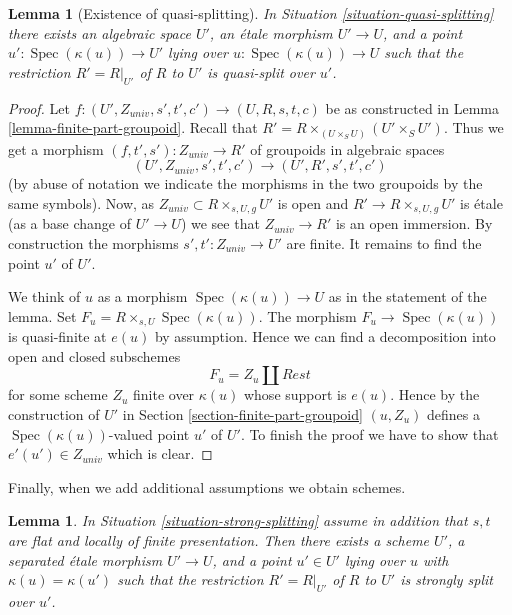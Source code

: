 \documentclass{stacks-project}
\theoremstyle{plain}
\newtheorem{lemma}[subsection]{Lemma}
\theoremstyle{definition}
\theoremstyle{remark}
\numberwithin{equation}{subsection}
\def\Spec{\mathop{\mathrm{Spec}}}
\begin{document}
\begin{lemma}[Existence of quasi-splitting]
\label{lemma-quasi-splitting}
In Situation \ref{situation-quasi-splitting}
there exists an algebraic space $U'$, an \'etale morphism
$U' \to U$, and a point $u' : \Spec(\kappa(u)) \to U'$
lying over $u : \Spec(\kappa(u)) \to U$
such that the restriction $R' = R|_{U'}$ of $R$ to $U'$
is quasi-split over $u'$.
\end{lemma}

\begin{proof}
Let $f : (U', Z_{univ}, s', t', c') \to (U, R, s, t, c)$ be as constructed in
Lemma \ref{lemma-finite-part-groupoid}.
Recall that $R' = R \times_{(U \times_S U)} (U' \times_S U')$.
Thus we get a morphism $(f, t', s') : Z_{univ} \to R'$ of groupoids
in algebraic spaces
$$
(U', Z_{univ}, s', t', c') \to (U', R', s', t', c')
$$
(by abuse of notation we indicate the morphisms in the two groupoids
by the same symbols). Now, as $Z_{univ} \subset R \times_{s, U, g} U'$ is open
and $R' \to R \times_{s, U, g} U'$ is \'etale (as a base change
of $U' \to U$) we see that $Z_{univ} \to R'$ is an open immersion.
By construction the morphisms $s', t' : Z_{univ} \to U'$ are finite.
It remains to find the point $u'$ of $U'$.

\medskip\noindent
We think of $u$ as a morphism $\Spec(\kappa(u)) \to U$ as in
the statement of the lemma. Set $F_u = R \times_{s, U} \Spec(\kappa(u))$.
The morphism $F_u \to \Spec(\kappa(u))$ is quasi-finite at $e(u)$
by assumption. Hence we can find a decomposition into open and closed
subschemes
$$
F_u = Z_u \amalg Rest
$$
for some scheme $Z_u$ finite over $\kappa(u)$ whose support is $e(u)$.
Hence by the construction of $U'$ in
Section \ref{section-finite-part-groupoid}
$(u, Z_u)$ defines a $\Spec(\kappa(u))$-valued
point $u'$ of $U'$. To finish the proof we have to show that
$e'(u') \in Z_{univ}$ which is clear.
\end{proof}

\noindent
Finally, when we add additional assumptions we obtain schemes.

\begin{lemma}
\label{lemma-strong-splitting-scheme}
In Situation \ref{situation-strong-splitting} assume in addition that
$s, t$ are flat and locally of finite presentation.
Then there exists a scheme $U'$, a separated \'etale morphism
$U' \to U$, and a point $u' \in U'$
lying over $u$ with $\kappa(u) = \kappa(u')$
such that the restriction $R' = R|_{U'}$ of $R$ to $U'$
is strongly split over $u'$.
\end{lemma}
\end{document}

